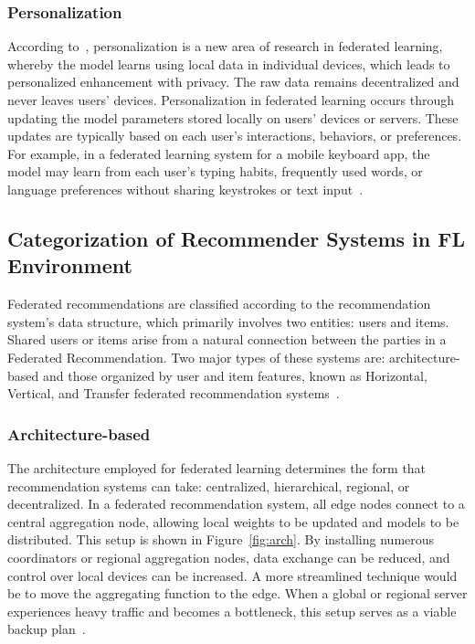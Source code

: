 \subsubsection{Personalization}
According to~\cite{ref13}, personalization is a new area of research in federated learning, whereby the model learns using local data in individual devices, which leads to personalized enhancement with privacy. The raw data remains decentralized and never leaves users' devices. Personalization in federated learning occurs through updating the model parameters stored locally on users' devices or servers. These updates are typically based on each user's interactions, behaviors, or preferences. For example, in a federated learning system for a mobile keyboard app, the model may learn from each user's typing habits, frequently used words, or language preferences without sharing keystrokes or text input~\cite{ref13}.

\subsection{Categorization of Recommender Systems in FL Environment}
Federated recommendations are classified according to the recommendation system's data structure, which primarily involves two entities: users and items. Shared users or items arise from a natural connection between the parties in a Federated Recommendation. Two major types of these systems are: architecture-based and those organized by user and item features, known as Horizontal, Vertical, and Transfer federated recommendation systems~\cite{ref12}.

\subsubsection{Architecture-based}
The architecture employed for federated learning determines the form that recommendation systems can take: centralized, hierarchical, regional, or decentralized. In a federated recommendation system, all edge nodes connect to a central aggregation node, allowing local weights to be updated and models to be distributed. This setup is shown in Figure~\ref{fig:arch}. By installing numerous coordinators or regional aggregation nodes, data exchange can be reduced, and control over local devices can be increased. A more streamlined technique would be to move the aggregating function to the edge. When a global or regional server experiences heavy traffic and becomes a bottleneck, this setup serves as a viable backup plan~\cite{ref12}.

